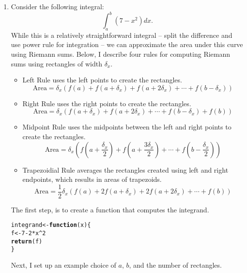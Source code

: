 \documentclass{article}\usepackage[]{graphicx}\usepackage[]{xcolor}
\makeatletter
\newcommand{\hlnum}[1]{\textcolor[rgb]{0.686,0.059,0.569}{#1}}%
\newcommand{\hlopt}[1]{\textcolor[rgb]{0,0,0}{#1}}%
\newcommand{\hldef}[1]{\textcolor[rgb]{0.345,0.345,0.345}{#1}}%
\newcommand{\hlkwa}[1]{\textcolor[rgb]{0.161,0.373,0.58}{\textbf{#1}}}%
\newcommand{\hlkwb}[1]{\textcolor[rgb]{0.69,0.353,0.396}{#1}}%
\newcommand{\hlkwc}[1]{\textcolor[rgb]{0.333,0.667,0.333}{#1}}%
\newcommand{\hlkwd}[1]{\textcolor[rgb]{0.737,0.353,0.396}{\textbf{#1}}}%
\newenvironment{kframe}{%
 \def\at@end@of@kframe{}%
 \ifinner\ifhmode%
  \def\at@end@of@kframe{\end{minipage}}%
  \begin{minipage}{\columnwidth}%
 \fi\fi%
 \def\FrameCommand##1{\hskip\@totalleftmargin \hskip-\fboxsep
 \colorbox{shadecolor}{##1}\hskip-\fboxsep
     \hskip-\linewidth \hskip-\@totalleftmargin \hskip\columnwidth}%
 \MakeFramed {\advance\hsize-\width
   \@totalleftmargin\z@ \linewidth\hsize
   \@setminipage}}%
 {\par\unskip\endMakeFramed%
 \at@end@of@kframe}
\newenvironment{knitrout}{}{} %
\makeatother
\begin{document}
\begin{enumerate}
\item Consider the following integral:
\[\int_{a}^{b} (7-x^2)dx.\]
While this is a relatively straightforward integral -- split the difference and use power rule for integration -- we can approximate the area under this curve using Riemann sums. Below, I describe four rules for computing Riemann sums using rectangles of width $\delta_x$.
\begin{itemize}
  \item Left Rule uses the left points to create the rectangles.
  \[\text{Area} = \delta_x (f(a) + f(a + \delta_x) + f(a +2\delta_x) + \cdots + f(b-\delta_x))\]
  \item Right Rule uses the right points to create the rectangles.
  \[\text{Area} = \delta_x (f(a + \delta_x) + f(a +2\delta_x) + \cdots + f(b-\delta_x) + f(b))\]
  \item Midpoint Rule uses the midpoints between the left and right points to create the rectangles.
  \[\text{Area} = \delta_x \left(f\left(a + \frac{\delta_x}{2}\right) + f\left(a + \frac{3\delta_x}{2}\right) + \cdots +  f\left(b - \frac{\delta_x}{2}\right)\right)\]
  \item Trapezoidial Rule averages the rectangles created using left and right endpoints, which results in areas of trapezoids.
  \[\text{Area} = \frac{1}{2} \delta_x \left(f(a) + 2f(a + \delta_x) + 2f(a+2\delta_x) + \cdots + f(b)\right)\]
\end{itemize}
The first step, is to create a function that computes the integrand.
\begin{knitrout}\scriptsize
{}\color{fgcolor}\begin{kframe}
\begin{alltt}
\hldef{integrand} \hlkwb{<-} \hlkwa{function}\hldef{(}\hlkwc{x}\hldef{)\{}
  \hldef{f} \hlkwb{<-} \hlnum{7} \hlopt{-} \hlnum{2} \hlopt{*} \hldef{x}\hlopt{^}\hlnum{2}
  \hlkwd{return}\hldef{(f)}
\hldef{\}}
\end{alltt}
\end{kframe}
\end{knitrout}
Next, I set up an example choice of $a$, $b$, and the number of rectangles.

\end{enumerate}
\end{document}
